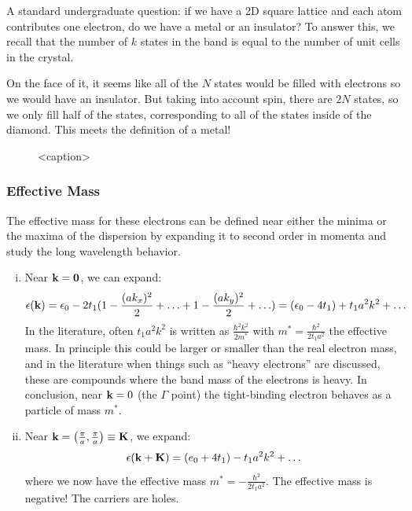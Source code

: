 A standard undergraduate question: if we have a 2D square lattice and each atom contributes one electron, do we have a metal or an insulator? To answer this, we recall that the number of $k$ states in the band is equal to the number of unit cells in the crystal.

On the face of it, it seems like all of the $N$ states would be filled with electrons so we would have an insulator. But taking into account spin, there are $2N$ states, so we only fill half of the states, corresponding to all of the states inside of the diamond. This meets the definition of a metal!

\begin{figure}[htbp]
    \centering
    
    \caption{<caption>}
    \label{<label>}
\end{figure}

\subsubsection{Effective Mass}
The effective mass for these electrons can be defined near either the minima or the maxima of the dispersion by expanding it to second order in momenta and study the long wavelength behavior.
\begin{enumerate}[(i)]
    \item Near $\mathbf{k} = \mathbf{0}$, we can expand:
    \begin{equation}
        \epsilon(\mathbf{k}) = \epsilon_0 - 2t_1(1 - \frac{(ak_x)^2}{2} + \ldots + 1 - \frac{(ak_y)^2}{2} + \ldots) = (\epsilon_0 - 4t_1) + t_1a^2k^2 + \ldots 
    \end{equation}
    In the literature, often $t_1a^2k^2$ is written as $\frac{\hbar^2 k^2}{2m^*}$ with $m^* = \frac{\hbar^2}{2t_1a^2}$ the effective mass. In principle this could be larger or smaller than the real electron mass, and in the literature when things such as ``heavy electrons'' are discussed, these are compounds where the band mass of the electrons is heavy. In conclusion, near $\mathbf{k} = 0$ (the $\Gamma$ point) the tight-binding electron behaves as a particle of mass $m^*$.

    \item Near $\mathbf{k} = \left(\frac{\pi}{a}, \frac{\pi}{a}\right) \equiv \mathbf{K}$, we expand:
    \begin{equation}
        \epsilon(\mathbf{k} + \mathbf{K}) = (e_0 + 4t_1) - t_1a^2k^2 + \ldots
    \end{equation}
    where we now have the effective mass $m^* = -\frac{\hbar^2}{2t_1 a^2}$. The effective mass is negative! The carriers are holes.
\end{enumerate}

